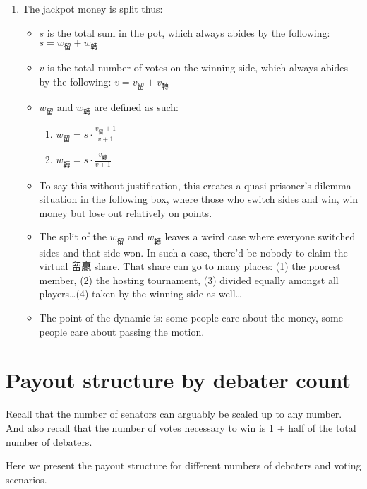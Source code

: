 \begin{enumerate}
    \item The jackpot money is split thus:
    \begin{itemize}
        \item $s$ is the total sum in the pot, which always abides by the following: $s = w_{\text{留}} + w_{\text{轉}}$
        \item $v$ is the total number of votes on the winning side, which always abides by the following: $v = v_{\text{留}} + v_{\text{轉}}$
        \item $w_{\text{留}}$ and $w_{\text{轉}}$ are defined as such:
        \begin{enumerate}
            \item $w_{\text{留}} = s \cdot \frac{v_{\text{留}}+1}{v+1}$
            \item $w_{\text{轉}} = s \cdot \frac{v_{\text{轉}}}{v+1}$
        \end{enumerate}
        \item To say this without justification, this creates a quasi-prisoner's dilemma situation in the following box, where those who switch sides and win, win money but lose out relatively on points.
        \item The split of the $w_{\text{留}}$ and $w_{\text{轉}}$ leaves a weird case where everyone switched sides and that side won. In such a case, there'd be nobody to claim the virtual 留贏 share. That share can go to many places: (1) the poorest member, (2) the hosting tournament, (3) divided equally amongst all players\ldots (4) taken by the winning side as well\ldots
        \item The point of the dynamic is: some people care about the money, some people care about passing the motion.

    \end{itemize}

\end{enumerate}



\section{Payout structure by debater count}
Recall that the number of senators can arguably be scaled up to any number. And also recall that the number of votes necessary to win is 1 + half of the total number of debaters.

Here we present the payout structure for different numbers of debaters and voting scenarios.


